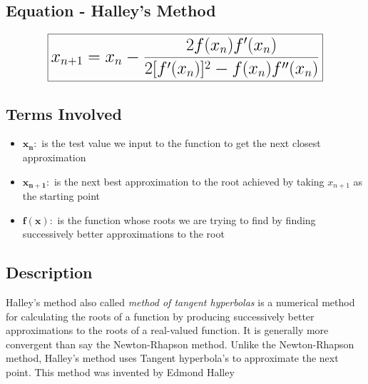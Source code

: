 
\subsection{Equation - Halley's Method}
\vspace{0.5cm}
\begin{equation}
	\LARGE\boxed{x_{n+1} = x_{n} - \frac{2f(x_{n})f'(x_{n})}  {2[f'(x_{n})]^2 - f(x_{n})f''(x_{n}) } }
	\label{eq: halley}
\end{equation}
\vspace{0.5cm}

\subsection{Terms Involved}
	\begin{itemize}
        	\item $\mathbf{x_{n}:}$ \indent is the test value we input to the function to get the  next closest approximation
        	\item $\mathbf{x_{n+1}:}$ \indent is the next best approximation to the root achieved by taking $ x_{n+1} $ as the starting point
        	\item $\mathbf{f(x):}$ \indent is the function whose roots we are trying to find by finding successively better approximations to the root
	\end{itemize}

\subsection{Description}
	\indent Halley's method also called \textit{method of tangent hyperbolas} is a numerical method for calculating the roots of a function by producing successively better approximations to the roots of 
		a real-valued function. It is generally more convergent than say the Newton-Rhapson method. Unlike the Newton-Rhapson method, Halley's method uses Tangent hyperbola's to approximate the next 
		point. This method was invented by Edmond Halley



